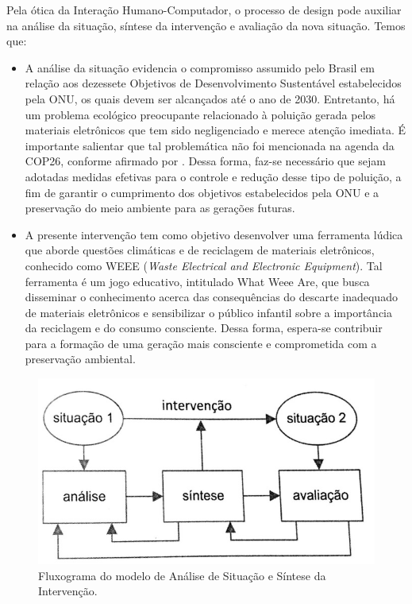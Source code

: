 Pela ótica da Interação Humano-Computador, o processo de design pode auxiliar na análise da situação, síntese da intervenção e avaliação da nova situação. Temos que:
\begin{itemize}
    \item A análise da situação evidencia o compromisso assumido pelo Brasil em relação aos dezessete Objetivos de Desenvolvimento Sustentável estabelecidos pela ONU, os quais devem ser alcançados até o ano de 2030. Entretanto, há um problema ecológico preocupante relacionado à poluição gerada pelos materiais eletrônicos que tem sido negligenciado e merece atenção imediata. É importante salientar que tal problemática não foi mencionada na agenda da COP26, conforme afirmado por \cite{skelton_2021} . Dessa forma, faz-se necessário que sejam adotadas medidas efetivas para o controle e redução desse tipo de poluição, a fim de garantir o cumprimento dos objetivos estabelecidos pela ONU e a preservação do meio ambiente para as gerações futuras.
    \item A presente intervenção tem como objetivo desenvolver uma ferramenta lúdica que aborde questões climáticas e de reciclagem de materiais eletrônicos, conhecido como WEEE (\textit{Waste Electrical and Electronic Equipment}). Tal ferramenta é um jogo educativo, intitulado What Weee Are, que busca disseminar o conhecimento acerca das consequências do descarte inadequado de materiais eletrônicos e sensibilizar o público infantil sobre a importância da reciclagem e do consumo consciente. Dessa forma, espera-se contribuir para a formação de uma geração mais consciente e comprometida com a preservação ambiental.
\end{itemize}
\begin{figure}[h]
    \centering
    \includegraphics[width=\textwidth]{figuras/intervencao.jpg}
    \caption{Fluxograma do modelo de Análise de Situação e Síntese da Intervenção.}
    \label{fig_intervencao}
\end{figure}
